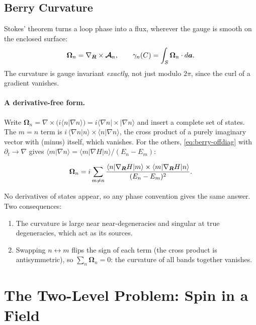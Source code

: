 \subsection{Berry Curvature}

Stokes' theorem turns a loop phase into a flux, wherever the gauge is smooth on the enclosed surface:
\[
    \bm{\Omega}_n = \nabla_{\bm{R}}\times\bm{\mathcal{A}}_n,
    \qquad
    \gamma_n(C) = \int_S\bm{\Omega}_n\cdot d\bm{a} .
\]
The curvature is gauge invariant \emph{exactly}, not just modulo $2\pi$, since the curl of a gradient vanishes.

\paragraph{A derivative-free form.} Write $\bm{\Omega}_n = \nabla\times\bigl(i\langle n|\nabla n\rangle\bigr) = i\langle\nabla n|\times|\nabla n\rangle$ and insert a complete set of states. The $m = n$ term is $i\,\langle\nabla n|n\rangle\times\langle n|\nabla n\rangle$, the cross product of a purely imaginary vector with (minus) itself, which vanishes. For the others, \eqref{eq:berry-offdiag} with $\partial_t\to\nabla$ gives $\langle m|\nabla n\rangle = \langle m|\nabla H|n\rangle/(E_n-E_m)$:

\begin{theorem}
\[
    \bm{\Omega}_n = i\sum_{m\neq n}\frac{\langle n|\nabla_{\bm{R}}H|m\rangle\times\langle m|\nabla_{\bm{R}}H|n\rangle}{(E_n-E_m)^2}.
\]
\end{theorem}

No derivatives of states appear, so any phase convention gives the same answer. Two consequences:
\begin{enumerate}
    \item The curvature is large near near-degeneracies and singular at true degeneracies, which act as its sources.
    \item Swapping $n\leftrightarrow m$ flips the sign of each term (the cross product is antisymmetric), so $\sum_n\bm{\Omega}_n = 0$: the curvature of all bands together vanishes.
\end{enumerate}

\section{The Two-Level Problem: Spin in a Field}

